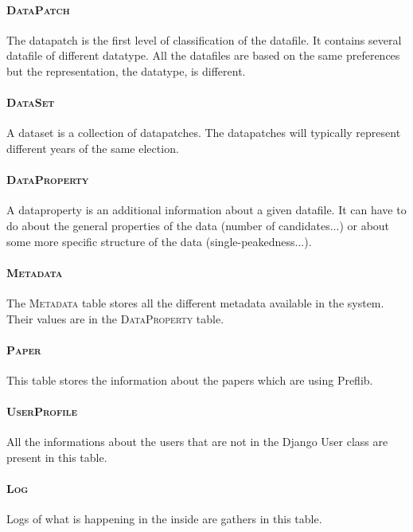 \documentclass{article}
\begin{document}
	\paragraph{\textsc{DataPatch}} The datapatch is the first level of classification of the datafile. It contains several datafile of different datatype. All the datafiles are based on the same preferences but the representation, the datatype, is different.
	
	\paragraph{\textsc{DataSet}} A dataset is a collection of datapatches. The datapatches will typically represent different years of the same election.
	
	\paragraph{\textsc{DataProperty}} A dataproperty is an additional information about a given datafile. It can have to do about the general properties of the data (number of candidates...) or about some more specific structure of the data (single-peakedness...).
	
	\paragraph{\textsc{Metadata}} The \textsc{Metadata} table stores all the different metadata available in the system. Their values are in the \textsc{DataProperty} table.
	
	\paragraph{\textsc{Paper}} This table stores the information about the papers which are using Preflib.
	
	\paragraph{\textsc{UserProfile}} All the informations about the users that are not in the Django User class are present in this table.
	
	\paragraph{\textsc{Log}} Logs of what is happening in the inside are gathers in this table.
	
	\medskip
	
\end{document}
